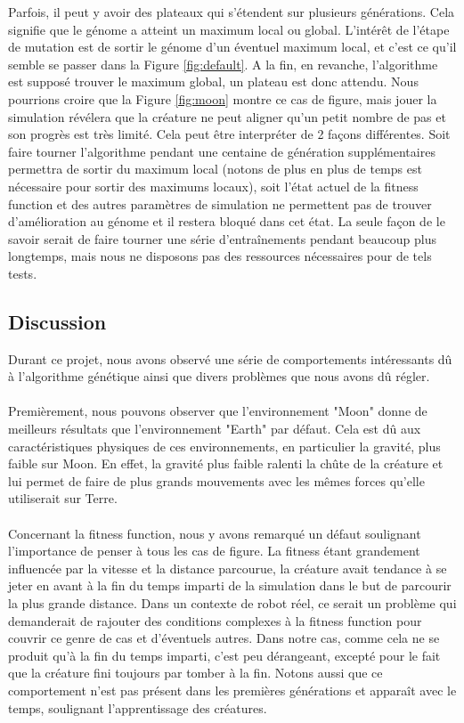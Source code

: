 \documentclass[journal, a4paper]{IEEEtran}
\begin{document}
Parfois, il peut y avoir des plateaux qui s'étendent sur plusieurs générations. Cela signifie que le génome a atteint un maximum local ou global. L'intérêt de l'étape de mutation est de sortir le génome d'un éventuel maximum local, et c'est ce qu'il semble se passer dans la Figure \ref{fig:default}. A la fin, en revanche, l'algorithme est supposé trouver le maximum global, un plateau est donc attendu. Nous pourrions croire que la Figure \ref{fig:moon} montre ce cas de figure, mais jouer la simulation révélera que la créature ne peut aligner qu'un petit nombre de pas et son progrès est très limité. Cela peut être interpréter de 2 façons différentes. Soit faire tourner l'algorithme pendant une centaine de génération supplémentaires permettra de sortir du maximum local (notons de plus en plus de temps est nécessaire pour sortir des maximums locaux), soit l'état actuel de la fitness function et des autres paramètres de simulation ne permettent pas de trouver d'amélioration au génome et il restera bloqué dans cet état. La seule façon de le savoir serait de faire tourner une série d'entraînements pendant beaucoup plus longtemps, mais nous ne disposons pas des ressources nécessaires pour de tels tests.

\subsection{Discussion}

Durant ce projet, nous avons observé une série de comportements intéressants dû à l'algorithme génétique ainsi que divers problèmes que nous avons dû régler. \\
\\
Premièrement, nous pouvons observer que l'environnement "Moon" donne de meilleurs résultats que l'environnement "Earth" par défaut. Cela est dû aux caractéristiques physiques de ces environnements, en particulier la gravité, plus faible sur Moon. En effet, la gravité plus faible ralenti la chûte de la créature et lui permet de faire de plus grands mouvements avec les mêmes forces qu'elle utiliserait sur Terre.
\\ \\
Concernant la fitness function, nous y avons remarqué un défaut soulignant l'importance de penser à tous les cas de figure. La fitness étant grandement influencée par la vitesse et la distance parcourue, la créature avait tendance à se jeter en avant à la fin du temps imparti de la simulation dans le but de parcourir la plus grande distance. Dans un contexte de robot réel, ce serait un problème qui demanderait de rajouter des conditions complexes à la fitness function pour couvrir ce genre de cas et d'éventuels autres. Dans notre cas, comme cela ne se produit qu'à la fin du temps imparti, c'est peu dérangeant, excepté pour le fait que la créature fini toujours par tomber à la fin. Notons aussi que ce comportement n'est pas présent dans les premières générations et apparaît avec le temps, soulignant l'apprentissage des créatures.
\end{document}
